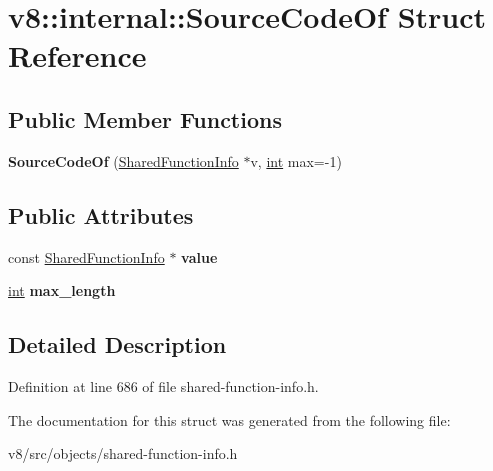 \hypertarget{structv8_1_1internal_1_1SourceCodeOf}{}\section{v8\+:\+:internal\+:\+:Source\+Code\+Of Struct Reference}
\label{structv8_1_1internal_1_1SourceCodeOf}
\subsection*{Public Member Functions}
\begin{DoxyCompactItemize}
\item 
\mbox{\label{structv8_1_1internal_1_1SourceCodeOf_a353fda7f55d77a8cb35e6774c65ac151}} 
{\bfseries Source\+Code\+Of} (\mbox{\hyperlink{classv8_1_1internal_1_1SharedFunctionInfo}{Shared\+Function\+Info}} $\ast$v, \mbox{\hyperlink{classint}{int}} max=-\/1)
\end{DoxyCompactItemize}
\subsection*{Public Attributes}
\begin{DoxyCompactItemize}
\item 
\mbox{\label{structv8_1_1internal_1_1SourceCodeOf_ac60e3e84fe5b71bc3a19dcf0cb7fbbe8}} 
const \mbox{\hyperlink{classv8_1_1internal_1_1SharedFunctionInfo}{Shared\+Function\+Info}} $\ast$ {\bfseries value}
\item 
\mbox{\label{structv8_1_1internal_1_1SourceCodeOf_abbb1e68e0622cae35e67653d7ede0560}} 
\mbox{\hyperlink{classint}{int}} {\bfseries max\+\_\+length}
\end{DoxyCompactItemize}


\subsection{Detailed Description}


Definition at line 686 of file shared-\/function-\/info.\+h.



The documentation for this struct was generated from the following file\+:\begin{DoxyCompactItemize}
\item 
v8/src/objects/shared-\/function-\/info.\+h\end{DoxyCompactItemize}
